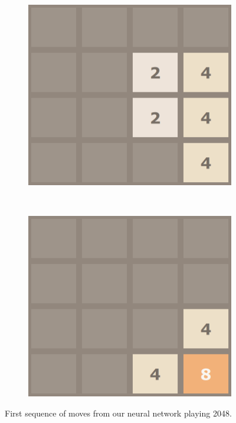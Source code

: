 \documentclass[11pt,a4paper]{article}
\begin{document}
\begin{figure}[h!]
\begin{subfigure}[b]{0.22\textwidth}
        \includegraphics[width=\textwidth]{figures/7}
    \end{subfigure}
    ~
    \begin{subfigure}[b]{0.22\textwidth}
        \includegraphics[width=\textwidth]{figures/8}
    \end{subfigure}
    \caption{First sequence of moves from our neural network playing 2048.}
    \label{fig:first_seq}
\end{figure}
\end{document}
